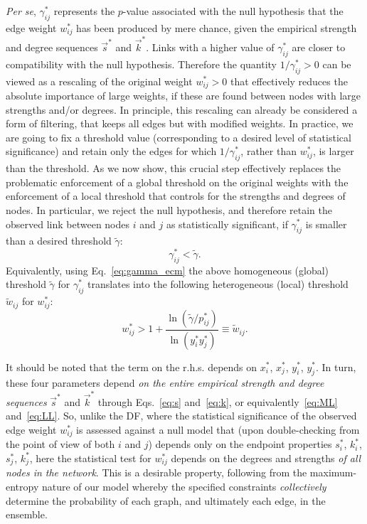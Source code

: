 \documentclass[aps,twocolumn,superscriptaddress]{revtex4-1}
\begin{document}
\emph{Per se}, $\gamma^\ast_{ij}$ represents the $p$-value associated with the null hypothesis that the edge weight $w_{ij}^\ast$ has been produced by mere chance, given the empirical strength and degree sequences $\vec{s}^\ast$ and $\vec{k}^\ast$. 
Links with a higher value of $\gamma^\ast_{ij}$ are closer to compatibility with the null hypothesis.
Therefore the quantity $1/\gamma^\ast_{ij}>0$ can be viewed as a rescaling of the original weight $w_{ij}^\ast>0$ that effectively reduces the absolute importance of large weights, if these are found between nodes with large strengths and/or degrees.
In principle, this rescaling can already be considered a form of filtering, that keeps all edges but with modified weights. 
In practice, we are going to fix a threshold value (corresponding to a desired level of statistical significance) and retain only the edges for which $1/\gamma^\ast_{ij}$, rather than $w^\ast_{ij}$, is larger than the threshold.
As we now show, this crucial step effectively replaces the problematic enforcement of a global threshold on the original weights with the enforcement of a local threshold that controls for the strengths and degrees of nodes.
In particular, we reject the null hypothesis, and therefore retain the observed link between nodes $i$ and $j$ as statistically significant, if $\gamma_{ij}^\ast$ is smaller than a desired threshold $\widetilde{\gamma}$:
\begin{equation}
\gamma^\ast_{ij}<\widetilde{\gamma}.
\label{eq:pvalue}
\end{equation}
Equivalently, using Eq.~\eqref{eq:gamma_ecm} the above homogeneous (global) threshold $\widetilde{\gamma}$ for $\gamma^\ast_{ij}$ translates into the following heterogeneous (local) threshold $\widetilde{w}_{ij}$ for $w^\ast_{ij}$:
\begin{equation}
w_{ij}^\ast>1+\frac{\ln (\widetilde{\gamma}/p_{ij}^\ast)}{\ln(y_i^\ast y_j^\ast)}\equiv \widetilde{w}_{ij}.
\label{eq:wtilde}
\end{equation}

It should be noted that the term on the r.h.s. depends on $x_i^\ast$, $x_j^\ast$, $y_i^\ast$, $y_j^\ast$. In turn, these four parameters depend \emph{on the entire empirical strength and degree sequences} $\vec{s}^*$ and $\vec{k}^*$ through Eqs.~\eqref{eq:s} and~\eqref{eq:k}, or equivalently~\eqref{eq:ML} and~\eqref{eq:LL}.
So, unlike the DF, where the statistical significance of the observed edge weight $w^\ast_{ij}$ is assessed against a null model that (upon double-checking from the point of view of both $i$ and $j$) depends only on the endpoint properties $s^\ast_{i}$, $k^\ast_{i}$, $s^\ast_{j}$, $k^\ast_{j}$, here the statistical test for $w^\ast_{ij}$ depends on the degrees and strengths \emph{of all nodes in the network}. 
This is a desirable property, following from the maximum-entropy nature of our model whereby the specified constraints \emph{collectively} determine the probability of each graph, and ultimately each edge, in the ensemble.\\
\end{document}
